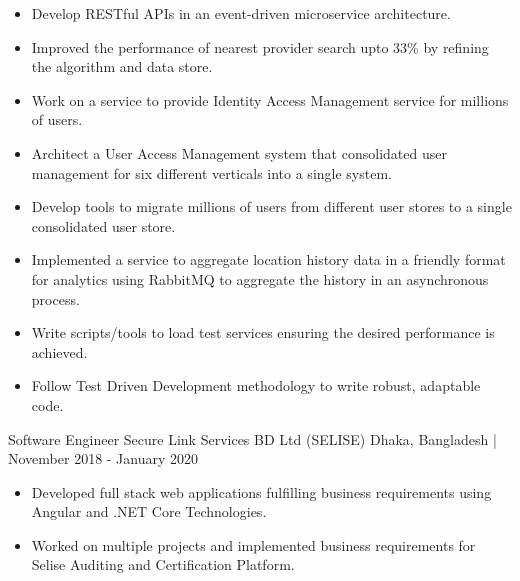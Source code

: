 \documentclass{resumestyle}
\begin{document}
    \begin{itemize}[labelsep=4pt,leftmargin=*,topsep=5pt,partopsep=0pt,itemsep=1pt]%
        \item Develop RESTful APIs in an event-driven microservice architecture.%
        \item Improved the performance of nearest provider search upto 33\% by refining the algorithm and data store.
        \item Work on a service to provide Identity Access Management service for millions of users.%
        \item Architect a User Access Management system that consolidated user management for six different verticals into a single system.%
        \item Develop tools to migrate millions of users from different user stores to a single consolidated user store.%
        \item Implemented a service to aggregate location history data in a friendly format for analytics using RabbitMQ to aggregate the history in an asynchronous process.%
        \item Write scripts/tools to load test services ensuring the desired performance is achieved.%
        \item Follow Test Driven Development methodology to write robust, adaptable code.%
    \end{itemize}%

    \vspace{4pt}%


    \worksubsection%
        {Software Engineer}%
        {Secure Link Services BD Ltd (SELISE)}%
        {Dhaka, Bangladesh | November 2018 - January 2020}%
    
    \begin{itemize}[labelsep=4pt,leftmargin=*,topsep=5pt,partopsep=0pt,itemsep=1pt]%
        \item Developed full stack web applications fulfilling business requirements using Angular and .NET Core Technologies.%
        \item Worked on multiple projects and implemented business requirements for Selise Auditing and Certification Platform.%
    \end{itemize}%

    \vspace{0pt}%

\end{document}

